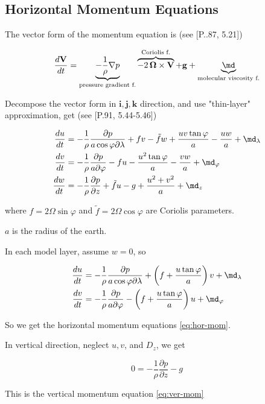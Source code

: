 
\subsection{Horizontal Momentum Equations \label{der:mom}}

The vector form of the momentum equation is (see \citet{Yang1982_book}[P..87,
5.21])


\begin{equation}
  \frac{d\mathbf{V}}{dt}=\underbrace{-\frac{1}{\rho}\nabla p}_\text{pressure
  gradient f.} 
  \overbrace{- 2\, \boldsymbol{\Omega} \times \mathbf{V}}^\text{Coriolis f.}
  +\mathbf{g}+ \underbrace{\boldsymbol{\md}}_\text{molecular viscosity f.}
\end{equation}

Decompose the vector form in $\mathbf{i}, \mathbf{j}, \mathbf{k}$ direction,
and use "thin-layer" approximation, get (see \citet{Yang1982_book}[P.91,
5.44-5.46])

\begin{subequations}
  \begin{align}
    \frac{du}{dt}&=-\frac{1}{\rho}\frac{\partial p}{a\cos\varphi\partial\lambda}+fv-\tilde{f}w+\frac{uv\tan\varphi}{a}-\frac{uw}{a}+\md_{\lambda} \\
    \frac{dv}{dt}&=-\frac{1}{\rho}\frac{\partial p}{a\partial\varphi}-fu-\frac{u^{2}\tan\varphi}{a}-\frac{vw}{a}+\md_{\varphi} \\
    \frac{dw}{dt}&=-\frac{1}{\rho}\frac{\partial p}{\partial z}+\tilde{f}u-g+\frac{u^{2}+v^{2}}{a}+\md_{z}
  \end{align}
\end{subequations}

where $f=2\Omega\sin\varphi$ and $\tilde{f}=2\Omega\cos\varphi$ are Coriolis parameters.


$a$ is the radius of the earth.


In each model layer, assume $w=0$, so

\begin{subequations}
  \begin{align}
    \frac{du}{dt}&=-\frac{1}{\rho}\frac{\partial
  p}{a\cos\varphi\partial\lambda}+\left(f+\frac{u\tan\varphi}{a}\right)v+\md_{\lambda} \\
    \frac{dv}{dt}&=-\frac{1}{\rho}\frac{\partial
p}{a\partial\varphi}-\left(f+\frac{u\tan\varphi}{a}\right)u+\md_{\varphi}
  \end{align}
\end{subequations}

So we get the horizontal momentum equations \ref{eq:hor-mom}.


In vertical direction, neglect $u,v$, and $D_z$, we get

\begin{equation}
  0 = - \frac{1}{\rho}\frac{\partial p}{\partial z} - g
\end{equation}

This is the vertical momentum equation \ref{eq:ver-mom}
